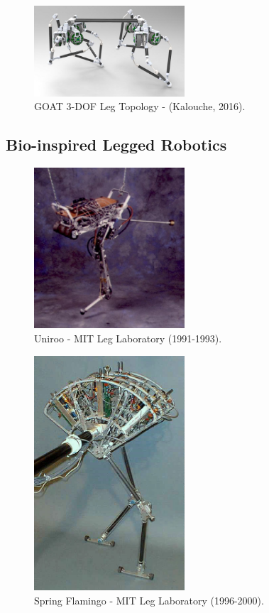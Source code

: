 \begin{figure}[H]
\centering
\includegraphics[width=0.5\textwidth]{images/literature/goat-leg.jpeg} 
\caption{GOAT 3-DOF Leg Topology - (Kalouche, 2016).}
\label{fig:goat-leg}
\end{figure}


\subsection{Bio-inspired Legged Robotics}

\begin{figure}[H]
\centering
\includegraphics[width=0.5\textwidth]{images/literature/uniroo-bioinspired.jpeg} 
\caption{Uniroo - MIT Leg Laboratory (1991-1993).}
\label{fig:uniroo-bioinspired}
\end{figure}

\begin{figure}[H]
\centering
\includegraphics[width=0.5\textwidth]{images/literature/spring-flamingo.jpg} 
\caption{Spring Flamingo - MIT Leg Laboratory (1996-2000).}
\label{fig:spring-flamingo}
\end{figure}

